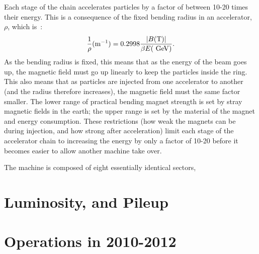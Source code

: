 Each stage of the chain accelerates particles by a factor of between 10-20 times their energy. This is a consequence of the fixed bending radius in an accelerator, $\rho$, which is~\cite{accelerator-book}:
%
\begin{equation}
\frac{1}{\rho} (\mathrm{m}^{-1}) = 0.2998 \frac{|B (\mathrm{T})|}{\beta E (\GeV)}.
\end{equation}
%
As the bending radius is fixed, this means that as the energy of the beam goes up, the magnetic field must go up linearly to keep the particles inside the ring. This also means that as particles are injected from one accelerator to another (and the radius therefore increases), the magnetic field must the same factor smaller. The lower range of practical bending magnet strength is set by stray magnetic fields in the earth; the upper range is set by the material of the magnet and energy consumption. These restrictions (how weak the magnets can be during injection, and how strong after acceleration) limit each stage of the accelerator chain to increasing the energy by only a factor of 10-20 before it becomes easier to allow another machine take over.



The machine is composed of eight essentially identical sectors, 

\section{Luminosity, and Pileup}
\label{lhc:luminosity-and-pileup}

\section{Operations in 2010-2012}